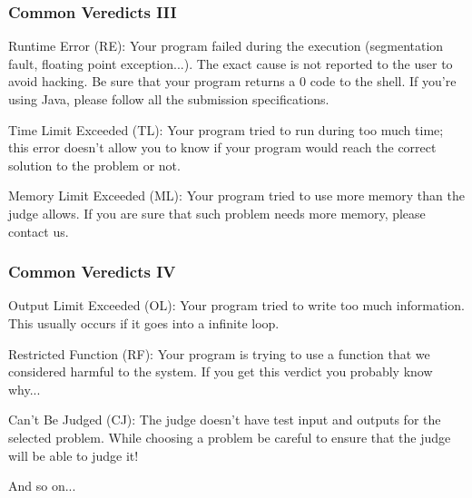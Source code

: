 \documentclass{beamer}
\begin{document}
\begin{frame}
	\frametitle {Common Veredicts III}
	
	\begin{block}{Runtime Error (RE):}
	Your program failed during the execution (segmentation fault, floating point exception...). The exact cause is not reported to the user to avoid hacking. Be sure that your program returns a 0 code to the shell. If you're using Java, please follow all the submission specifications.
	\end{block}
	
	\begin{block}{Time Limit Exceeded (TL):}
	Your program tried to run during too much time; this error doesn't allow you to know if your program would reach the correct solution to the problem or not.
	\end{block}

	\begin{block}{Memory Limit Exceeded (ML):}
	Your program tried to use more memory than the judge allows. If you are sure that such problem needs more memory, please contact us.
	\end{block}	
	
\end{frame}

\begin{frame}
	\frametitle {Common Veredicts IV}
	\begin{block}{Output Limit Exceeded (OL):}
	Your program tried to write too much information. This usually occurs if it goes into a infinite loop.
	\end{block}
	
	\begin{block}{Restricted Function (RF):}
	Your program is trying to use a function that we considered harmful to the system. If you get this verdict you probably know why...
	\end{block}
	
	\begin{block}{Can't Be Judged (CJ):}
	The judge doesn't have test input and outputs for the selected problem. While choosing a problem be careful to ensure that the judge will be able to judge it!
	\end{block}

	And so on...	
	
\end{frame}

\end{document}
